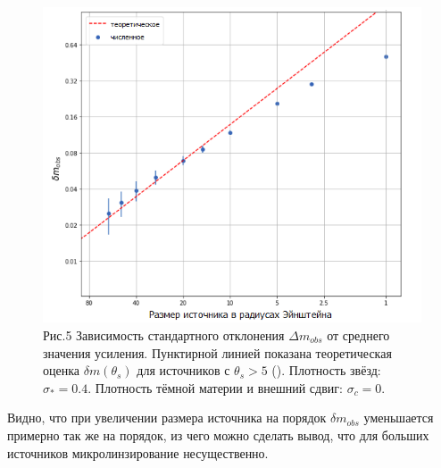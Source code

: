 \begin{figure}[H]
    \centering
	\includegraphics[scale=0.69]{pics/size_np_std.png}
	\caption{ Рис.5 Зависимость стандартного отклонения $\Delta m_{obs}$ от среднего значения усиления. Пунктирной линией показана теоретическая оценка $\delta m (\theta_s)$ для источников с $\theta_s > 5$ (\cite{refsdalstabell1991}). Плотность звёзд: $\sigma_*=0.4$. Плотность тёмной материи и внешний сдвиг: $\sigma_c=0$. \label{fig:refstab} } 
\end{figure}
Видно, что при увеличении размера источника на порядок $\delta m_{obs}$ уменьшается примерно так же на порядок, из чего можно сделать вывод, что для больших источников микролинзирование несущественно.